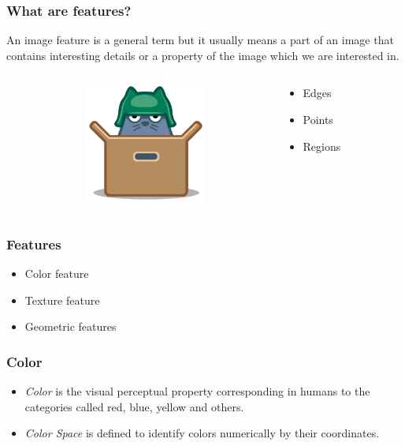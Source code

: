 \documentclass[notheorems,serif,table,compress]{beamer}  %
\begin{document}
\begin{frame}
\frametitle{What are features?}
An image feature is a general term but it usually means a part of an image that contains interesting details or a property of the image which we are interested in.
\begin{columns}
\begin{column}{\leftmargini}
\end{column}
\begin{column}{0.5\linewidth}
\centering\includegraphics[width=4cm]{image}
\end{column}
\begin{column}{0.7\linewidth}
\begin{itemize}
\item Edges
\item Points
\item Regions
\end{itemize}
\end{column}
\end{columns}\vspace{1ex}
\end{frame}


\begin{frame}
\frametitle{Features}
\begin{itemize}
\item Color feature
\item Texture feature
\item Geometric features
\end{itemize}
\end{frame}


\begin{frame}
\frametitle{Color}
\begin{itemize}
\item {\color{blue}\emph{Color}} is the visual perceptual property corresponding in humans to the categories called red, blue, yellow and others.
\item {\color{blue}\emph{Color Space}} is defined to identify colors numerically by their coordinates.
\end{itemize}
\end{frame}
\end{document}
